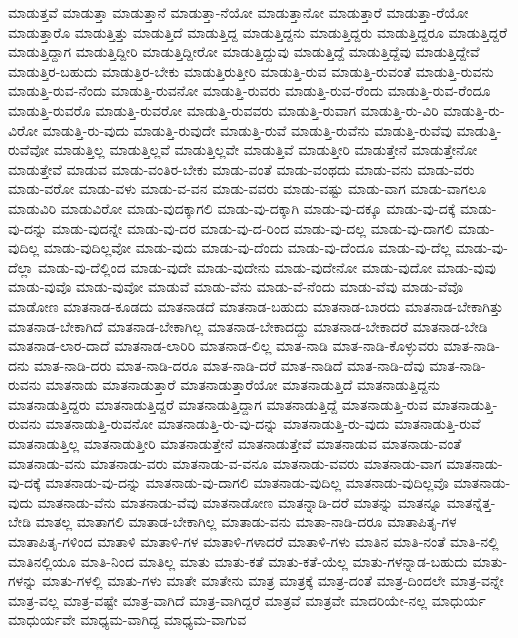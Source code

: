 {ಮಾಡುತ್ತವೆ
ಮಾಡುತ್ತಾ
ಮಾಡುತ್ತಾನೆ
ಮಾಡುತ್ತಾ-ನೆಯೋ
ಮಾಡುತ್ತಾನೋ
ಮಾಡುತ್ತಾರೆ
ಮಾಡುತ್ತಾ-ರೆಯೋ
ಮಾಡುತ್ತಾರೊ
ಮಾಡುತ್ತಿತ್ತು
ಮಾಡುತ್ತಿದೆ
ಮಾಡುತ್ತಿದ್ದ
ಮಾಡುತ್ತಿದ್ದನು
ಮಾಡುತ್ತಿದ್ದರು
ಮಾಡುತ್ತಿದ್ದರೂ
ಮಾಡುತ್ತಿದ್ದರೆ
ಮಾಡುತ್ತಿದ್ದಾಗ
ಮಾಡುತ್ತಿದ್ದೀರಿ
ಮಾಡುತ್ತಿದ್ದೀರೋ
ಮಾಡುತ್ತಿದ್ದುವು
ಮಾಡುತ್ತಿದ್ದೆ
ಮಾಡುತ್ತಿದ್ದೆವು
ಮಾಡುತ್ತಿದ್ದೇವೆ
ಮಾಡುತ್ತಿರ-ಬಹುದು
ಮಾಡುತ್ತಿರ-ಬೇಕು
ಮಾಡುತ್ತಿರುತ್ತೀರಿ
ಮಾಡುತ್ತಿ-ರುವ
ಮಾಡುತ್ತಿ-ರುವಂತೆ
ಮಾಡುತ್ತಿ-ರುವನು
ಮಾಡುತ್ತಿ-ರುವ-ನೆಂದು
ಮಾಡುತ್ತಿ-ರುವನೋ
ಮಾಡುತ್ತಿ-ರುವರು
ಮಾಡುತ್ತಿ-ರುವ-ರೆಂದು
ಮಾಡುತ್ತಿ-ರುವ-ರೆಂದೂ
ಮಾಡುತ್ತಿ-ರುವರೊ
ಮಾಡುತ್ತಿ-ರುವರೋ
ಮಾಡುತ್ತಿ-ರುವವರು
ಮಾಡುತ್ತಿ-ರುವಾಗ
ಮಾಡುತ್ತಿ-ರು-ವಿರಿ
ಮಾಡುತ್ತಿ-ರು-ವಿರೋ
ಮಾಡುತ್ತಿ-ರು-ವುದು
ಮಾಡುತ್ತಿ-ರುವುದೇ
ಮಾಡುತ್ತಿ-ರುವೆ
ಮಾಡುತ್ತಿ-ರುವೆನು
ಮಾಡುತ್ತಿ-ರುವೆವು
ಮಾಡುತ್ತಿ-ರುವೆವೋ
ಮಾಡುತ್ತಿಲ್ಲ
ಮಾಡುತ್ತಿಲ್ಲವೆ
ಮಾಡುತ್ತಿಲ್ಲವೇ
ಮಾಡುತ್ತಿವೆ
ಮಾಡುತ್ತೀರಿ
ಮಾಡುತ್ತೇನೆ
ಮಾಡುತ್ತೇನೋ
ಮಾಡುತ್ತೇವೆ
ಮಾಡುವ
ಮಾಡು-ವಂತಿರ-ಬೇಕು
ಮಾಡು-ವಂತೆ
ಮಾಡು-ವಂಥದು
ಮಾಡು-ವನು
ಮಾಡು-ವರು
ಮಾಡು-ವರೋ
ಮಾಡು-ವಳು
ಮಾಡು-ವ-ವನ
ಮಾಡು-ವವರು
ಮಾಡು-ವಷ್ಟು
ಮಾಡು-ವಾಗ
ಮಾಡು-ವಾಗಲೂ
ಮಾಡುವಿರಿ
ಮಾಡುವಿರೋ
ಮಾಡು-ವುದಕ್ಕಾಗಲಿ
ಮಾಡು-ವು-ದಕ್ಕಾಗಿ
ಮಾಡು-ವು-ದಕ್ಕೂ
ಮಾಡು-ವು-ದಕ್ಕೆ
ಮಾಡು-ವು-ದನ್ನು
ಮಾಡು-ವುದನ್ನೇ
ಮಾಡು-ವು-ದರ
ಮಾಡು-ವು-ದ-ರಿಂದ
ಮಾಡು-ವು-ದಲ್ಲ
ಮಾಡು-ವು-ದಾಗಲಿ
ಮಾಡು-ವುದಿಲ್ಲ
ಮಾಡು-ವುದಿಲ್ಲವೋ
ಮಾಡು-ವುದು
ಮಾಡು-ವು-ದೆಂದು
ಮಾಡು-ವು-ದೆಂದೂ
ಮಾಡು-ವು-ದೆಲ್ಲ
ಮಾಡು-ವು-ದೆಲ್ಲಾ
ಮಾಡು-ವು-ದೆಲ್ಲಿಂದ
ಮಾಡು-ವುದೇ
ಮಾಡು-ವುದೇನು
ಮಾಡು-ವುದೇನೋ
ಮಾಡು-ವುದೋ
ಮಾಡು-ವುವು
ಮಾಡು-ವುವೊ
ಮಾಡು-ವುವೋ
ಮಾಡುವೆ
ಮಾಡು-ವೆನು
ಮಾಡು-ವೆ-ನೆಂದು
ಮಾಡು-ವೆವು
ಮಾಡು-ವೆವೊ
ಮಾಡೋಣ
ಮಾತನಾಡ-ಕೂಡದು
ಮಾತನಾಡದೆ
ಮಾತನಾಡ-ಬಹುದು
ಮಾತನಾಡ-ಬಾರದು
ಮಾತನಾಡ-ಬೇಕಾಗಿತ್ತು
ಮಾತನಾಡ-ಬೇಕಾಗಿದೆ
ಮಾತನಾಡ-ಬೇಕಾಗಿಲ್ಲ
ಮಾತನಾಡ-ಬೇಕಾದದ್ದು
ಮಾತನಾಡ-ಬೇಕಾದರೆ
ಮಾತನಾಡ-ಬೇಡಿ
ಮಾತನಾಡ-ಲಾರ-ದಾದೆ
ಮಾತನಾಡ-ಲಾರಿರಿ
ಮಾತನಾಡ-ಲಿಲ್ಲ
ಮಾತ-ನಾಡಿ
ಮಾತ-ನಾಡಿ-ಕೊಳ್ಳುವರು
ಮಾತ-ನಾಡಿ-ದನು
ಮಾತ-ನಾಡಿ-ದರು
ಮಾತ-ನಾಡಿ-ದರೂ
ಮಾತ-ನಾಡಿ-ದರೆ
ಮಾತ-ನಾಡಿದೆ
ಮಾತ-ನಾಡಿ-ದೆವು
ಮಾತ-ನಾಡಿ-ರುವನು
ಮಾತನಾಡು
ಮಾತನಾಡುತ್ತಾರೆ
ಮಾತನಾಡುತ್ತಾರೆಯೋ
ಮಾತನಾಡುತ್ತಿದೆ
ಮಾತನಾಡುತ್ತಿದ್ದನು
ಮಾತನಾಡುತ್ತಿದ್ದರು
ಮಾತನಾಡುತ್ತಿದ್ದರೆ
ಮಾತನಾಡುತ್ತಿದ್ದಾಗ
ಮಾತನಾಡುತ್ತಿದ್ದೆ
ಮಾತನಾಡುತ್ತಿ-ರುವ
ಮಾತನಾಡುತ್ತಿ-ರುವನು
ಮಾತನಾಡುತ್ತಿ-ರುವನೋ
ಮಾತನಾಡುತ್ತಿ-ರು-ವು-ದನ್ನು
ಮಾತನಾಡುತ್ತಿ-ರು-ವುದು
ಮಾತನಾಡುತ್ತಿ-ರುವೆ
ಮಾತನಾಡುತ್ತಿಲ್ಲ
ಮಾತನಾಡುತ್ತೀರಿ
ಮಾತನಾಡುತ್ತೇನೆ
ಮಾತನಾಡುತ್ತೇವೆ
ಮಾತನಾಡುವ
ಮಾತನಾಡು-ವಂತೆ
ಮಾತನಾಡು-ವನು
ಮಾತನಾಡು-ವರು
ಮಾತನಾಡು-ವ-ವನೂ
ಮಾತನಾಡು-ವವರು
ಮಾತನಾಡು-ವಾಗ
ಮಾತನಾಡು-ವು-ದಕ್ಕೆ
ಮಾತನಾಡು-ವು-ದನ್ನು
ಮಾತನಾಡು-ವು-ದಾಗಲಿ
ಮಾತನಾಡು-ವುದಿಲ್ಲ
ಮಾತನಾಡು-ವುದಿಲ್ಲವೊ
ಮಾತನಾಡು-ವುದು
ಮಾತನಾಡು-ವೆನು
ಮಾತನಾಡು-ವೆವು
ಮಾತನಾಡೋಣ
ಮಾತನ್ನಾಡಿ-ದರೆ
ಮಾತನ್ನು
ಮಾತನ್ನೂ
ಮಾತನ್ನೆತ್ತ-ಬೇಡಿ
ಮಾತಲ್ಲ
ಮಾತಾಗಲಿ
ಮಾತಾಡ-ಬೇಕಾಗಿಲ್ಲ
ಮಾತಾಡು-ವನು
ಮಾತಾ-ನಾಡಿ-ದರೂ
ಮಾತಾಪಿತೃ-ಗಳ
ಮಾತಾಪಿತೃ-ಗಳಿಂದ
ಮಾತಾಳಿ
ಮಾತಾಳಿ-ಗಳ
ಮಾತಾಳಿ-ಗಳಾದರೆ
ಮಾತಾಳಿ-ಗಳು
ಮಾತಿನ
ಮಾತಿ-ನಂತೆ
ಮಾತಿ-ನಲ್ಲಿ
ಮಾತಿನಲ್ಲಿಯೂ
ಮಾತಿ-ನಿಂದ
ಮಾತಿಲ್ಲ
ಮಾತು
ಮಾತು-ಕತೆ
ಮಾತು-ಕತೆ-ಯೆಲ್ಲ
ಮಾತು-ಗಳನ್ನಾಡ-ಬಹುದು
ಮಾತು-ಗಳನ್ನು
ಮಾತು-ಗಳಲ್ಲಿ
ಮಾತು-ಗಳು
ಮಾತೇ
ಮಾತೇನು
ಮಾತ್ರ
ಮಾತ್ರಕ್ಕೆ
ಮಾತ್ರ-ದಂತೆ
ಮಾತ್ರ-ದಿಂದಲೇ
ಮಾತ್ರ-ವನ್ನೇ
ಮಾತ್ರ-ವಲ್ಲ
ಮಾತ್ರ-ವಷ್ಟೇ
ಮಾತ್ರ-ವಾಗಿದೆ
ಮಾತ್ರ-ವಾಗಿದ್ದರೆ
ಮಾತ್ರವೆ
ಮಾತ್ರವೇ
ಮಾದರಿಯೇ-ನಲ್ಲ
ಮಾಧುರ್ಯ
ಮಾಧುರ್ಯವೇ
ಮಾಧ್ಯಮ-ವಾಗಿದ್ದ
ಮಾಧ್ಯಮ-ವಾಗುವ
}

